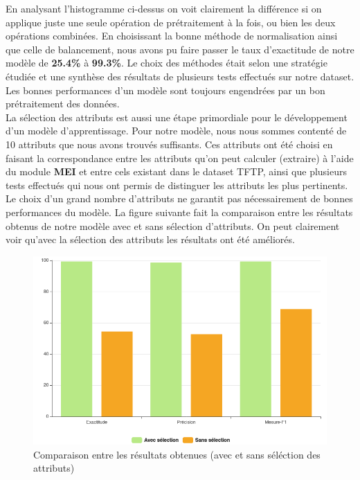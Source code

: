 En analysant l'histogramme ci-dessus on voit clairement la différence si on applique juste une seule opération de prétraitement à la fois, ou bien les deux opérations combinées. En choisissant la bonne méthode de normalisation ainsi que celle de balancement, nous avons pu faire passer le taux d'exactitude de notre modèle de \textbf{25.4\%} à \textbf{99.3\%}. Le choix des méthodes était selon une stratégie étudiée et une synthèse des résultats de plusieurs tests effectués sur notre dataset. Les bonnes performances d'un modèle sont toujours engendrées par un bon prétraitement des données.\\

\newpage
La sélection des attributs est aussi une étape primordiale pour le développement d'un modèle d'apprentissage. Pour notre modèle, nous nous sommes contenté de 10 attributs que nous avons trouvés suffisants. Ces attributs ont été choisi en faisant la correspondance entre les attributs qu'on peut calculer (extraire) à l'aide du module \textbf{MEI}  et entre cels existant dans le dataset TFTP, ainsi que plusieurs tests effectués qui nous ont permis de distinguer les attributs les plus pertinents. \\

\noindent Le choix d'un grand nombre d'attributs ne garantit pas nécessairement de bonnes performances du modèle. La figure suivante fait la comparaison entre les résultats obtenus de notre modèle avec et sans sélection d'attributs. On peut clairement voir qu'avec la sélection des attributs les résultats ont été améliorés.\\
\begin{figure}[H]
\centering
\includegraphics[width=\textwidth]{Figures/attributsHist}
\decoRule
\caption{Comparaison entre les résultats obtenues (avec et sans séléction des attributs)}
\label{fig:histogrammeAttributs}
\end{figure} 

